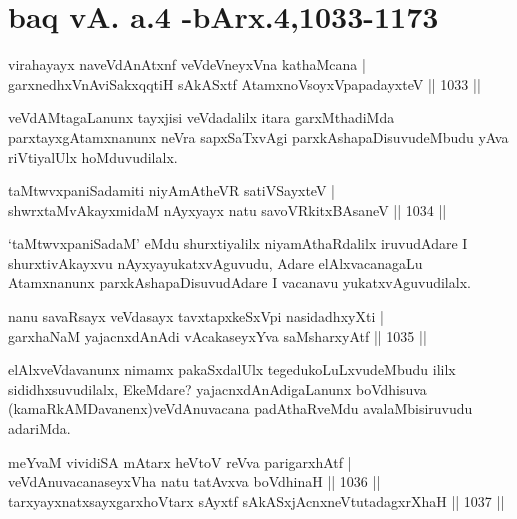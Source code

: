 \section*{baq vA. a.4 -bArx.4,1033-1173}


\begin{shl}
virahayayx naveVdAnAtxnf veVdeVneyxVna kathaMcana |
garxnedhxVnA\s\s viSakxqqtiH sAkASxtf AtamxnoVsoyxVpapadayxteV || 1033 ||
\end{shl}

\begin{artha}
veVdAMtagaLanunx tayxjisi veVdadalilx itara garxMthadiMda parxtayxgAtamxnanunx neVra
sapxSaTxvAgi parxkAshapaDisuvudeMbudu yAva riVtiyalUlx hoMduvudilalx.
\end{artha}

\begin{shl}
taMtwvxpaniSadamiti niyAmAtheVR satiVSayxteV |\\
shwrxtaMvAkayxmidaM nAyxyayx natu savoVRkitxBAsaneV || 1034 ||
\end{shl}

\begin{artha}
`taMtwvxpaniSadaM' eMdu shurxtiyalilx niyamAthaRdalilx iruvudAdare I shurxtivAkayxvu 
nAyxyayukatxvAguvudu, Adare elAlxvacanagaLu Atamxnanunx parxkAshapaDisuvudAdare I vacanavu 
yukatxvAguvudilalx.
\end{artha}


\begin{shl}
nanu savaRsayx veVdasayx tavxtapxkeSxV\s pi nasidadhxyXti |\\
garxhaNaM yajacnxdAnAdi vAcakaseyxYva saMsharxyAtf || 1035 ||
\end{shl}

\begin{artha}
elAlxveVdavanunx nimamx pakaSxdalUlx tegedukoLuLxvudeMbudu ililx sididhxsuvudilalx, EkeMdare? yajacnxdAnAdigaLanunx boVdhisuva (kamaRkAMDavanenx)veVdAnuvacana padAthaRveMdu avalaMbisiruvudu adariMda.
\end{artha}


\begin{shl}
meYvaM vividiSA mAtarx heVtoV reVva parigarxhAtf |\\
veVdAnuvacanaseyxVha natu tatAvxva boVdhinaH || 1036 ||\\
tarxyayxnatxsayxgarxhoVtarx sAyxtf sAkASxjAcnxneVtutadagxrXhaH || 1037 ||
\end{shl}

